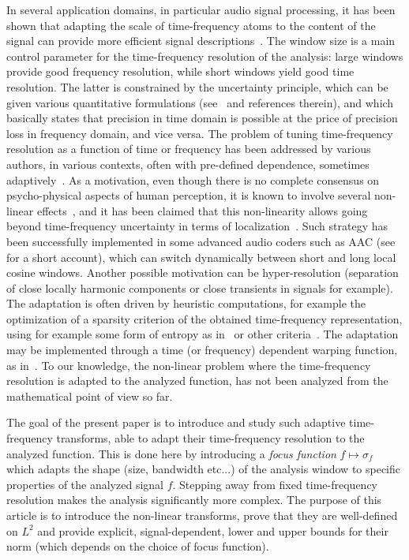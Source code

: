 In several application domains, in particular audio signal processing, it has been shown that adapting the scale of time-frequency atoms to the content of the signal can provide more efficient signal descriptions~\cite{Jaillet2007time,Liuni2013automatic,Leiber2023differentiable}. The window size is a main control parameter for the time-frequency resolution of the analysis: large windows provide good frequency resolution, while short windows yield good time resolution. The latter is constrained by the uncertainty principle, which can be given various quantitative formulations (see~\cite{Folland1997uncertainty,Ricaud2013refined} and references therein), and which basically states that precision in time domain is possible at the price of precision loss in frequency domain, and vice versa. The problem of tuning time-frequency resolution as a function of time or frequency has been addressed by various authors, in various contexts, often with pre-defined dependence, sometimes adaptively~\cite{Liuni2013automatic,Leiber2023differentiable}.  As a motivation, even though there is no complete consensus on psycho-physical aspects of human perception, it is known to involve several non-linear effects~\cite{Oxenham2018how}, and it has been claimed that this non-linearity allows going beyond time-frequency uncertainty in terms of localization~\cite{Oppenheim2013human}. Such strategy has been successfully implemented in some advanced audio coders such as AAC (see~\cite{Brandenburg1999mp3} for a short account), which can switch dynamically between short and long local cosine windows. Another possible motivation can be  hyper-resolution (separation of close locally harmonic components or close transients in signals for example). The adaptation is often driven by heuristic computations, for example the optimization of a sparsity criterion of the obtained time-frequency representation, using for example some form of entropy as in~\cite{Jaillet2007time,Liuni2013automatic} or other criteria~\cite{Leiber2023differentiable}. The adaptation may be implemented through a time (or frequency) dependent warping function, as in~\cite{Holighaus2019continuous}. To our knowledge, the non-linear problem where the time-frequency resolution is adapted to the analyzed function, has not been analyzed from the mathematical point of view so far.

\smallskip
The goal of the present paper is to introduce and study such adaptive time-frequency transforms, able to adapt their time-frequency resolution to the analyzed function.
This is done here by introducing a \textit{focus function} $f\mapsto\sigma_f$ which adapts the shape (size, bandwidth etc...) of the analysis window to specific properties of the analyzed signal $f$. %
Stepping away from fixed time-frequency resolution makes the analysis significantly more complex.
The purpose of this article is to introduce the non-linear transforms, prove that they are well-defined on $L^2$ and provide explicit, signal-dependent, lower and upper bounds for their norm (which depends on the choice of focus function).

